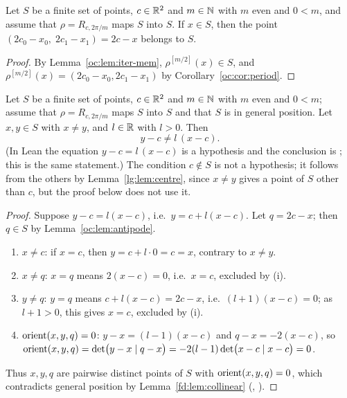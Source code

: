 \begin{lemma}\label{oc:lem:antipode}
Let $S$ be a finite set of points, $c\in\mathbb R^2$ and $m\in\mathbb N$ with $m$ even and $0<m$, and assume that
$\rho=R_{c,2\pi/m}$ maps $S$ into $S$. If $x\in S$, then the point $(2c_0-x_0,\;2c_1-x_1)=2c-x$ belongs
to $S$.
\end{lemma}
\begin{proof}
By Lemma~\ref{oc:lem:iter-mem}, $\rho^{[m/2]}(x)\in S$, and $\rho^{[m/2]}(x)=(2c_0-x_0,2c_1-x_1)$ by
Corollary~\ref{oc:cor:period}.
\end{proof}

\begin{lemma}\label{oc:lem:same-ray}
Let $S$ be a finite set of points, $c\in\mathbb R^2$ and $m\in\mathbb N$ with $m$ even and $0<m$; assume that
$\rho=R_{c,2\pi/m}$ maps $S$ into $S$ and that $S$ is in general position. Let $x,y\in S$ with $x\ne y$,
and $l\in\mathbb R$ with $l>0$. Then
\[y-c\ne l\,(x-c).\]
(In Lean the equation $y-c=l\,(x-c)$ is a hypothesis and the conclusion is ; this is the
same statement.) The condition $c\notin S$ is not a hypothesis; it follows from the others by
Lemma~\ref{lg:lem:centre}, since $x\ne y$ gives a point of $S$ other than $c$, but the proof below does
not use it.
\end{lemma}
\begin{proof}
Suppose $y-c=l(x-c)$, i.e.\ $y=c+l(x-c)$. Let $q=2c-x$; then $q\in S$ by Lemma~\ref{oc:lem:antipode}.
\begin{enumerate}[label=(\roman*)]
\item $x\ne c$: if $x=c$, then $y=c+l\cdot0=c=x$, contrary to $x\ne y$.
\item $x\ne q$: $x=q$ means $2(x-c)=0$, i.e.\ $x=c$, excluded by (i).
\item $y\ne q$: $y=q$ means $c+l(x-c)=2c-x$, i.e.\ $(l+1)(x-c)=0$; as $l+1>0$, this gives $x=c$, excluded by
  (i).
\item $\operatorname{orient}(x,y,q)=0$: $y-x=(l-1)(x-c)$ and $q-x=-2(x-c)$, so
  $\operatorname{orient}(x,y,q)=\det\bigl(y-x\mid q-x\bigr)=-2(l-1)\det\bigl(x-c\mid x-c\bigr)=0$.
\end{enumerate}
Thus $x,y,q$ are pairwise distinct points of $S$ with $\operatorname{orient}(x,y,q)=0$, which contradicts general
position by Lemma~\ref{fd:lem:collinear} (,
).
\end{proof}

